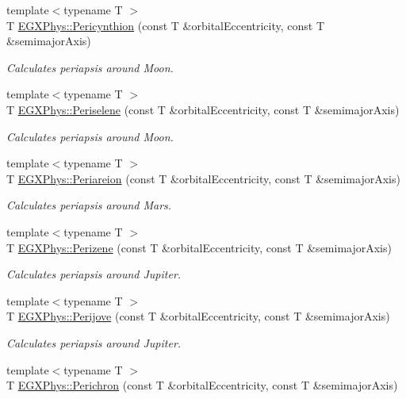 \begin{DoxyCompactItemize}
{\footnotesize template$<$typename T $>$ }\\T \hyperlink{group___astrophysics_gaeeba153b188cd06cbd233eaef12f0a6a}{E\+G\+X\+Phys\+::\+Pericynthion} (const T \&orbital\+Eccentricity, const T \&semimajor\+Axis)
\begin{DoxyCompactList}\small\item\em Calculates periapsis around Moon. \end{DoxyCompactList}\item 
{\footnotesize template$<$typename T $>$ }\\T \hyperlink{group___astrophysics_ga255874374dde571531e443cdbef9ef0c}{E\+G\+X\+Phys\+::\+Periselene} (const T \&orbital\+Eccentricity, const T \&semimajor\+Axis)
\begin{DoxyCompactList}\small\item\em Calculates periapsis around Moon. \end{DoxyCompactList}\item 
{\footnotesize template$<$typename T $>$ }\\T \hyperlink{group___astrophysics_ga0617ba07a30b0fd0544c02f691bfae26}{E\+G\+X\+Phys\+::\+Periareion} (const T \&orbital\+Eccentricity, const T \&semimajor\+Axis)
\begin{DoxyCompactList}\small\item\em Calculates periapsis around Mars. \end{DoxyCompactList}\item 
{\footnotesize template$<$typename T $>$ }\\T \hyperlink{group___astrophysics_ga0523c65b7fc26e675388b2c3d38aa00b}{E\+G\+X\+Phys\+::\+Perizene} (const T \&orbital\+Eccentricity, const T \&semimajor\+Axis)
\begin{DoxyCompactList}\small\item\em Calculates periapsis around Jupiter. \end{DoxyCompactList}\item 
{\footnotesize template$<$typename T $>$ }\\T \hyperlink{group___astrophysics_ga075052f7ff9aa1d5fdf4501b493be86b}{E\+G\+X\+Phys\+::\+Perijove} (const T \&orbital\+Eccentricity, const T \&semimajor\+Axis)
\begin{DoxyCompactList}\small\item\em Calculates periapsis around Jupiter. \end{DoxyCompactList}\item 
{\footnotesize template$<$typename T $>$ }\\T \hyperlink{group___astrophysics_ga12b5e99aa2e3e7031ef6ce93060cf516}{E\+G\+X\+Phys\+::\+Perichron} (const T \&orbital\+Eccentricity, const T \&semimajor\+Axis)

\end{DoxyCompactItemize}
